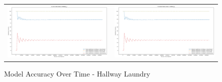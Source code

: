 \begin{figure}
  \begin{tabular}{cc}
    {\includegraphics[width = 3in]{images/results/Future_Predictions_on_hallway_L.png}} &
    {\includegraphics[width = 3in]{images/results/Historical_Predictions_on_hallway_L.png}} \\
  \end{tabular}
  \caption{Model Accuracy Over Time - Hallway Laundry}
\end{figure}\\ \\



